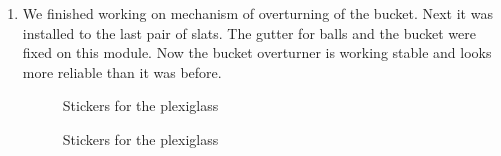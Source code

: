 \begin{enumerate}
\begin{enumerate}
        \item We finished working on mechanism of overturning of the bucket. Next it was installed to the last pair of slats. The gutter for balls and the bucket were fixed on this module. Now the bucket overturner is working stable and looks more reliable than it was before.
        \begin{figure}[H]
        	\begin{minipage}[h]{0.47\linewidth}
        		\caption{Stickers for the plexiglass}
        	\end{minipage}
        	\hfill
        	\begin{minipage}[h]{0.47\linewidth}
        		\caption{Stickers for the plexiglass}
        	\end{minipage}
        \end{figure}
        

\end{enumerate}
\end{enumerate}
